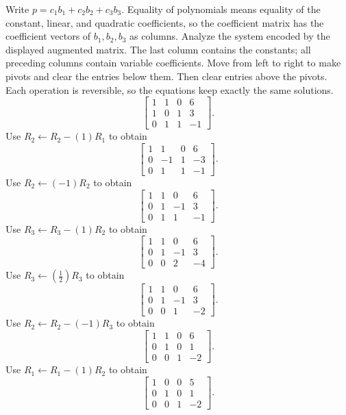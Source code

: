 Write $p=c_1b_1+c_2b_2+c_3b_3$. Equality of polynomials means equality of the constant, linear, and quadratic coefficients, so the coefficient matrix has the coefficient vectors of $b_1,b_2,b_3$ as columns.
\goal Analyze the system encoded by the displayed augmented matrix. The last column contains the constants; all preceding columns contain variable coefficients.
\idea Move from left to right to make pivots and clear the entries below them. Then clear entries above the pivots. Each operation is reversible, so the equations keep exactly the same solutions.
\[ \left[\begin{array}{rrr|r}1&1&0&6\\1&0&1&3\\0&1&1&-1\end{array}\right].\]
Use $R_{2}\leftarrow R_{2}-(1)R_{1}$ to obtain
\[ \left[\begin{array}{rrr|r}1&1&0&6\\0&-1&1&-3\\0&1&1&-1\end{array}\right].\]
Use $R_{2}\leftarrow(-1)R_{2}$ to obtain
\[ \left[\begin{array}{rrr|r}1&1&0&6\\0&1&-1&3\\0&1&1&-1\end{array}\right].\]
Use $R_{3}\leftarrow R_{3}-(1)R_{2}$ to obtain
\[ \left[\begin{array}{rrr|r}1&1&0&6\\0&1&-1&3\\0&0&2&-4\end{array}\right].\]
Use $R_{3}\leftarrow(\frac{1}{2})R_{3}$ to obtain
\[ \left[\begin{array}{rrr|r}1&1&0&6\\0&1&-1&3\\0&0&1&-2\end{array}\right].\]
Use $R_{2}\leftarrow R_{2}-(-1)R_{3}$ to obtain
\[ \left[\begin{array}{rrr|r}1&1&0&6\\0&1&0&1\\0&0&1&-2\end{array}\right].\]
Use $R_{1}\leftarrow R_{1}-(1)R_{2}$ to obtain
\[ \left[\begin{array}{rrr|r}1&0&0&5\\0&1&0&1\\0&0&1&-2\end{array}\right].\]
